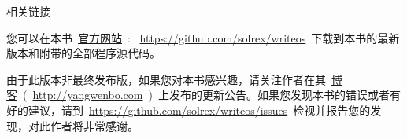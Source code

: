 \vspace{5ex}

\begin{lined}{\textwidth}\vspace{2ex}
\begin{center}
相关链接
\end{center}
\vspace{2ex}
\end{lined}

您可以在本书~\href{https://github.com/solrex/writeos}{官方网站}~: ~\url{https://github.com/solrex/writeos}~下载到本书的最新版本和附带的全部程序源代码。

由于此版本非最终发布版，如果您对本书感兴趣，请关注作者在其~\href{http://yangwenbo.com/articles/category/cs/opensource/writeos}{博客}~(~\url{http://yangwenbo.com}~)~上发布的更新公告。如果您发现本书的错误或者有好的建议，请到~\url{https://github.com/solrex/writeos/issues}~检视并报告您的发现，对此作者将非常感谢。
